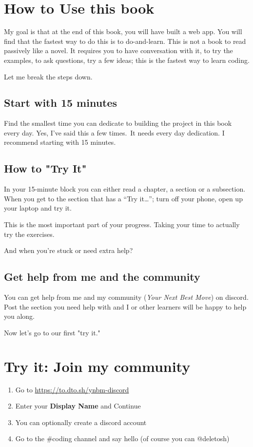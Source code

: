 \section{How to Use this book}\label{sec:how-to-use}
My goal is that at the end of this book, you will have built a web app.
You will find that the fastest way to do this is to do-and-learn.
This is not a book to read passively like a novel.
It requires you to have conversation with it, to try the examples,
to ask questions, try a few ideas; this is the fastest way to learn coding.

Let me break the steps down.
%
\subsection{Start with 15 minutes}\label{subsec:start-with-15-minutes}
Find the smallest time you can dedicate to building the project in this book every day.
Yes, I've said this a few times.\ It needs every day dedication.
I recommend starting with 15 minutes.

\subsection{How to "Try It"}\label{subsec:the-trying-it}
In your 15-minute block you can either read a chapter, a section or a subsection.
When you get to the section that has a ``Try it\ldots''; turn off your phone, open up your laptop and try it.

This is the most important part of your progress.
Taking your time to actually try the exercises.

And when you're stuck or need extra help?

\subsection{Get help from me and the community}\label{subsec:get-help-from-me}

You can get help from me and my community (\emph{Your Next Best Move}) on discord.
Post the section you need help with and I or other learners will be happy to help you along.

Now let's go to our first "try it."


\section{Try it: Join my community}\label{sec:try-it: lajoin-my-community}

\begin{enumerate}
    \item Go to \url{https://to.dto.sh/ynbm-discord}
    \item Enter your \textbf{Display Name} and Continue
    \item You can optionally create a discord account
    \item Go to the \#coding channel and say hello (of course you can @deletosh)
\end{enumerate}
